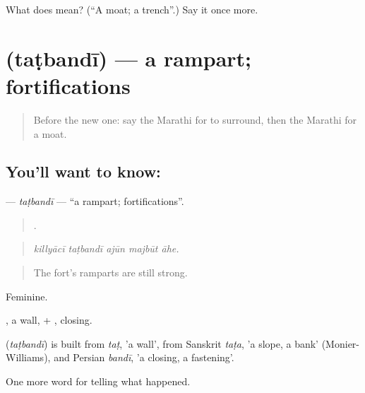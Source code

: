 \begin{tcolorbox}[breakable,colback=teal!4,colframe=teal!35!black,title={Before you move on}]
What does  mean? (\textquotedblleft{}A moat; a trench\textquotedblright{}.) Say it once more.
\end{tcolorbox}
\section[\texorpdfstring{\mr{तटबंदी} (taṭbandī)}{तटबंदी (taṭbandī)}]{ (taṭbandī) — a rampart; fortifications}

\label{lesson:MR-C331-tatbandi}



\begin{quote}
Before the new one: say the Marathi for to surround, then the Marathi for a moat.
\end{quote}

\subsection*{You'll want to know: }
\textbf{} — \emph{taṭbandī} — \textquotedblleft{}a rampart; fortifications\textquotedblright{}.

\begin{quote}
    .
\end{quote}

\begin{quote}
\emph{killyācī taṭbandī ajūn majbūt āhe.}
\end{quote}

\begin{quote}
The fort's ramparts are still strong.
\end{quote}

Feminine.

, a wall, + , closing.

\begin{cousinweb}
\textbf{} (\emph{taṭbandī}) is built from \emph{taṭ}, 'a wall', from Sanskrit \emph{taṭa}, 'a slope, a bank' (Monier-Williams), and Persian \emph{bandī}, 'a closing, a fastening'.
\end{cousinweb}

\begin{grammarlens}[title={What you've built}]
One more word for telling what happened.
\end{grammarlens}


